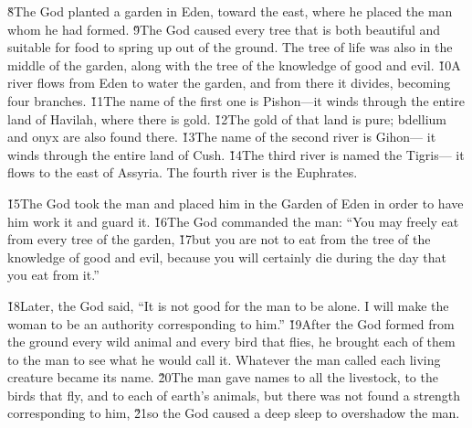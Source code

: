 \v{8}The  God planted a garden in Eden, toward the east, where he placed the man whom he had formed. \v{9}The  God caused every tree that is both beautiful and suitable for food to spring up out of the ground. The tree of life was also in the middle of the garden, along with the tree of the knowledge of good and evil. \v{10}A river flows from Eden to water the garden, and from there it divides, becoming four branches. \v{11}The name of the first one is Pishon---it winds through the entire land of Havilah, where there is gold. \v{12}The gold of that land is pure; bdellium and onyx are also found there. \v{13}The name of the second river is Gihon--- it winds through the entire land of Cush. \v{14}The third river is named the Tigris--- it flows to the east of Assyria. The fourth river is the Euphrates.

\v{15}The  God took the man and placed him in the Garden of Eden in order to have him work it and guard it. \v{16}The  God commanded the man: ``You may freely eat from every tree of the garden, \v{17}but you are not to eat from the tree of the knowledge of good and evil, because you will certainly die during the day that you eat from it.''

\v{18}Later, the  God said, ``It is not good for the man to be alone. I will make the woman to be an authority corresponding to him.'' \v{19}After the  God formed from the ground every wild animal and every bird that flies, he brought each of them to the man to see what he would call it. Whatever the man called each living creature became its name. \v{20}The man gave names to all the livestock, to the birds that fly, and to each of earth's animals, but there was not found a strength corresponding to him, \v{21}so the  God caused a deep sleep to overshadow the man.

